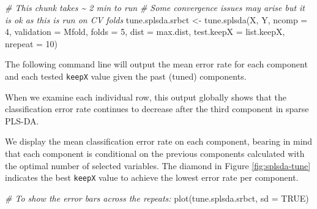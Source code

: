 \documentclass[
]{book}
\newenvironment{Shaded}{\begin{snugshade}}{\end{snugshade}}
\newcommand{\AttributeTok}[1]{\textcolor[rgb]{0.77,0.63,0.00}{#1}}
\newcommand{\CommentTok}[1]{\textcolor[rgb]{0.56,0.35,0.01}{\textit{#1}}}
\newcommand{\ConstantTok}[1]{\textcolor[rgb]{0.00,0.00,0.00}{#1}}
\newcommand{\DecValTok}[1]{\textcolor[rgb]{0.00,0.00,0.81}{#1}}
\newcommand{\FunctionTok}[1]{\textcolor[rgb]{0.00,0.00,0.00}{#1}}
\newcommand{\NormalTok}[1]{#1}
\newcommand{\OtherTok}[1]{\textcolor[rgb]{0.56,0.35,0.01}{#1}}
\newcommand{\SpecialCharTok}[1]{\textcolor[rgb]{0.00,0.00,0.00}{#1}}
\newcommand{\StringTok}[1]{\textcolor[rgb]{0.31,0.60,0.02}{#1}}
\begin{document}
\begin{Shaded}
\begin{Highlighting}[]
\CommentTok{\# This chunk takes \textasciitilde{} 2 min to run}
\CommentTok{\# Some convergence issues may arise but it is ok as this is run on CV folds}
\NormalTok{tune.splsda.srbct }\OtherTok{\textless{}{-}} \FunctionTok{tune.splsda}\NormalTok{(X, Y, }\AttributeTok{ncomp =} \DecValTok{4}\NormalTok{, }\AttributeTok{validation =} \StringTok{\textquotesingle{}Mfold\textquotesingle{}}\NormalTok{, }
                                 \AttributeTok{folds =} \DecValTok{5}\NormalTok{, }\AttributeTok{dist =} \StringTok{\textquotesingle{}max.dist\textquotesingle{}}\NormalTok{, }
                                 \AttributeTok{test.keepX =}\NormalTok{ list.keepX, }\AttributeTok{nrepeat =} \DecValTok{10}\NormalTok{)}
\end{Highlighting}
\end{Shaded}

The following command line will output the mean error rate for each component and each tested \texttt{keepX} value given the past (tuned) components.

\begin{Shaded}
\end{Shaded}

When we examine each individual row, this output globally shows that the classification error rate continues to decrease after the third component in sparse PLS-DA.

We display the mean classification error rate on each component, bearing in mind that each component is conditional on the previous components calculated with the optimal number of selected variables. The diamond in Figure \ref{fig:splsda-tune} indicates the best \texttt{keepX} value to achieve the lowest error rate per component.

\begin{Shaded}
\begin{Highlighting}[]
\CommentTok{\# To show the error bars across the repeats:}
\FunctionTok{plot}\NormalTok{(tune.splsda.srbct, }\AttributeTok{sd =} \ConstantTok{TRUE}\NormalTok{)}
\end{Highlighting}
\end{Shaded}
\end{document}
